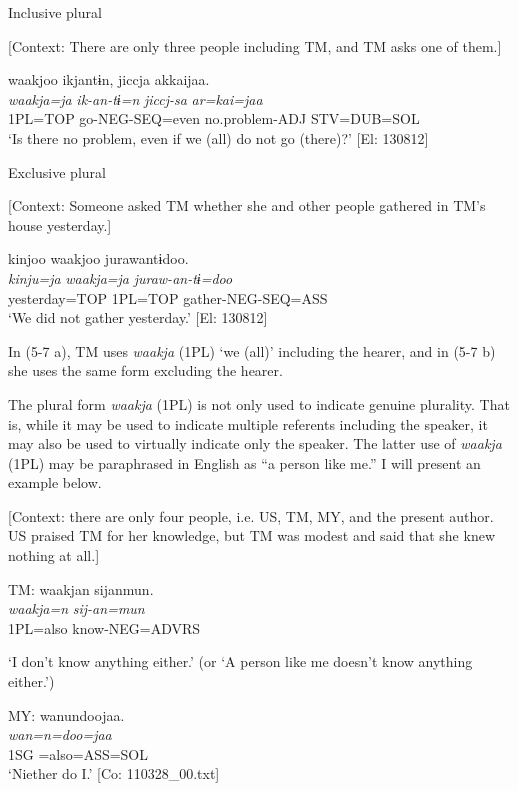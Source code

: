 \ea \label{ex:5:7}  \ea \label{ex:5:7a} Inclusive plural

    [Context: There are only three people including TM, and TM asks one of them.]

\glll  waakjoo  ikjantɨn,  jiccja  akkaijaa.\\
\textit{waakja=ja}  \textit{ik-an-tɨ=n}  \textit{jiccj-sa}  \textit{ar=kai=jaa}\\
1PL=TOP  go-NEG-SEQ=even  no.problem-ADJ  STV=DUB=SOL\\
\glt ‘Is there no problem, even if we (all) do not go (there)?’ [El: 130812]

 \ex \label{ex:5:b} Exclusive plural

    [Context: Someone asked TM whether she and other people gathered in TM’s house yesterday.]

\glll  kinjoo  waakjoo  jurawantɨdoo.\\
\textit{kinju=ja}  \textit{waakja=ja}  \textit{juraw-an-tɨ=doo}\\
yesterday=TOP  1PL=TOP  gather-NEG-SEQ=ASS\\
\glt ‘We did not gather yesterday.’ [El: 130812]
\z
\z

In (5-7 a), TM uses \textit{waakja} (1PL) ‘we (all)’ including the hearer, and in (5-7 b) she uses the same form excluding the hearer.

  The plural form \textit{waakja} (1PL) is not only used to indicate genuine plurality. That is, while it may be used to indicate multiple referents including the speaker, it may also be used to virtually indicate only the speaker. The latter use of \textit{waakja} (1PL) may be paraphrased in English as “a person like me.” I will present an example below.

\ea \label{ex:5:8}   [Context: there are only four people, i.e. US, TM, MY, and the present author. US praised TM for her knowledge, but TM was modest and said that she knew nothing at all.]

  TM: \glll  waakjan  sijanmun.\\
    \textit{waakja=n}  \textit{sij-an=mun}\\
    1PL=also  know-NEG=ADVRS\\
    \glt {} \parbox{\linewidth-\widthof{TM:}}{‘I don’t know anything either.’ (or ‘A person like me doesn’t know anything either.’)}

MY: \glll  wanundoojaa.\\
\textit{wan=n=doo=jaa}\\
1SG =also=ASS=SOL\\
\glt {} ‘Niether do I.’ [Co: 110328\_00.txt]
\z

